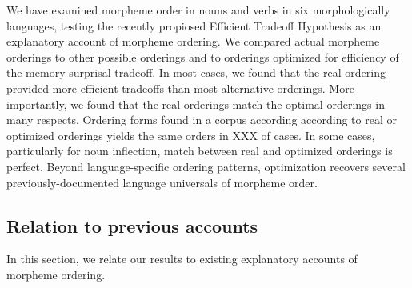 \documentclass[11pt,letterpaper]{article}
\begin{document}
We have examined morpheme order in nouns and verbs in six morphologically languages, testing the recently propiosed Efficient Tradeoff Hypothesis \citep{hahn2020modeling} as an explanatory account of morpheme ordering.
We compared actual morpheme orderings to other possible orderings and to orderings optimized for efficiency of the memory-surprisal tradeoff.
In most cases, we found that the real ordering provided more efficient tradeoffs than most alternative orderings.
More importantly, we found that the real orderings match the optimal orderings in many respects.
Ordering forms found in a corpus according according to real or optimized orderings yields the same orders in XXX of cases.
In some cases, particularly for noun inflection, match between real and optimized orderings is perfect.
Beyond language-specific ordering patterns, optimization recovers several previously-documented language universals of morpheme order.

\subsection{Relation to previous accounts}






In this section, we relate our results to existing explanatory accounts of morpheme ordering.

\end{document}

